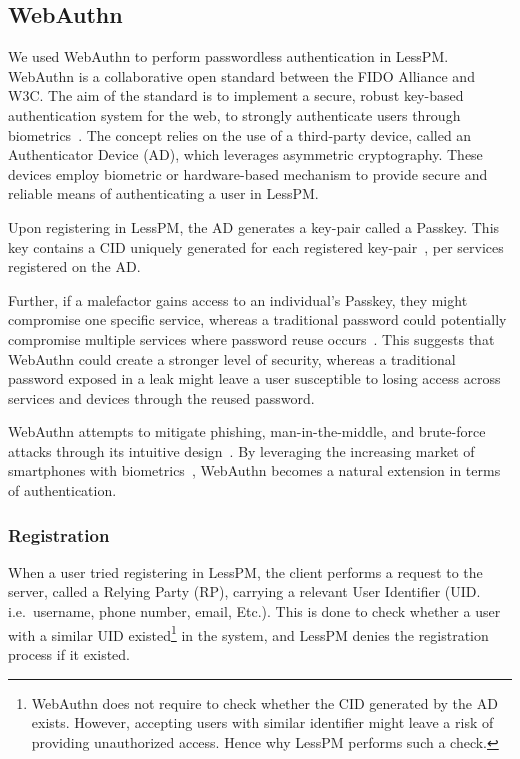 \subsection{WebAuthn}\label{subsec:webauthn-methodology}
We used WebAuthn to perform passwordless authentication in LessPM.
WebAuthn is a collaborative open standard between the FIDO Alliance and W3C\@.
The aim of the standard is to implement a secure, robust key-based
authentication system for the web, to strongly authenticate users through
biometrics~\cite{webauthn_level_2}.
The concept relies on the use of a third-party device, called an
Authenticator Device (AD), which leverages asymmetric cryptography.
These devices employ biometric or hardware-based mechanism to provide secure
and reliable means of authenticating a user in LessPM\@.

Upon registering in LessPM, the AD generates a key-pair called a Passkey.
This key contains a CID uniquely generated for each registered
key-pair~\cite{webauthn_credential_id,webauthn_public_key_credential}, per
services registered on the AD\@.

Further, if a malefactor gains access to an individual's Passkey, they might
compromise one specific service, whereas a traditional password could
potentially compromise multiple services where password reuse
occurs~\cite{wang2018next}.
This suggests that WebAuthn could create a stronger level of security, whereas
a traditional password exposed in a leak might leave a user susceptible to
losing access across services and devices through the reused password.

WebAuthn attempts to mitigate phishing, man-in-the-middle, and brute-force
attacks through its intuitive design~\cite{webauthn_level_2}.
By leveraging the increasing market of smartphones with
biometrics~\cite{statista-biometric-transactions}, WebAuthn becomes a natural
extension in terms of authentication.

\subsubsection{Registration}\label{subsubsec:metho-registration}
When a user tried registering in LessPM, the client performs a request to the
server, called a Relying Party (RP), carrying a relevant User Identifier
(UID. i.e.\ username, phone number, email, Etc.).
This is done to check whether a user with a similar UID existed\footnote{
  WebAuthn does not require to check whether the CID generated by the AD exists.
  However, accepting users with similar identifier might leave a risk of
  providing unauthorized access.
  Hence why LessPM performs such a check.
} in the system, and LessPM denies the registration process if it existed.

